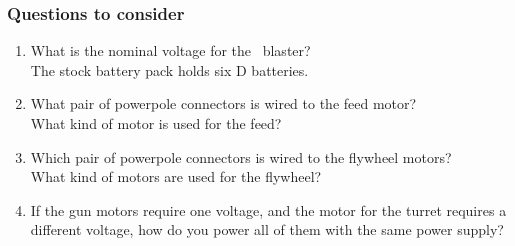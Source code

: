 \documentclass[aspectratio=169]{beamer}
\begin{document}
\begin{frame}
\frametitle{Questions to consider}
\begin{enumerate}
\item What is the nominal voltage for the \usnaCourseNumber\ blaster?\\
{\scriptsize The stock battery pack holds six D batteries.}
\item What pair of powerpole connectors is wired to the feed motor?\\
{\scriptsize What kind of motor is used for the feed?}
\item Which pair of powerpole connectors is wired to the flywheel motors?\\
{\scriptsize What kind of motors are used for the flywheel?}
\item If the gun motors require one voltage, and the motor for the turret requires a different voltage, how do you power all of them with the same power supply? 
\end{enumerate}
\end{frame}
\end{document}
